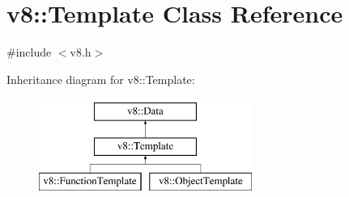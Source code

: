 \hypertarget{classv8_1_1Template}{\section{v8\-:\-:Template Class Reference}
\label{classv8_1_1Template}
}


{\ttfamily \#include $<$v8.\-h$>$}

Inheritance diagram for v8\-:\-:Template\-:\begin{figure}[H]
\begin{center}
\leavevmode
\includegraphics[height=3.000000cm]{classv8_1_1Template}
\end{center}
\end{figure}
